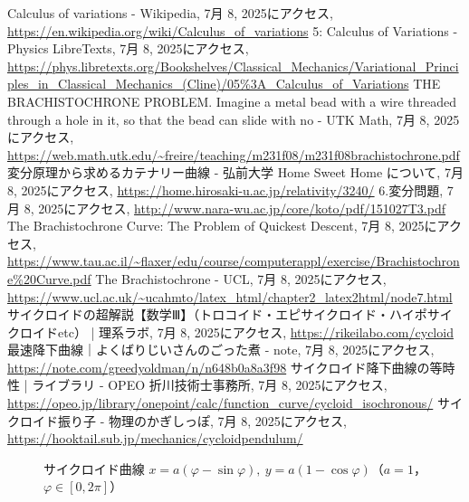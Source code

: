 \documentclass[12pt,a4paper]{ltjsarticle}
\begin{document}
\begin{thebibliography}{99}
 Calculus of variations - Wikipedia, 7月 8, 2025にアクセス, \url{https://en.wikipedia.org/wiki/Calculus_of_variations}
 5: Calculus of Variations - Physics LibreTexts, 7月 8, 2025にアクセス, \url{https://phys.libretexts.org/Bookshelves/Classical_Mechanics/Variational_Principles_in_Classical_Mechanics_(Cline)/05%3A_Calculus_of_Variations}
 THE BRACHISTOCHRONE PROBLEM. Imagine a metal bead with a wire threaded through a hole in it, so that the bead can slide with no - UTK Math, 7月 8, 2025にアクセス, \url{https://web.math.utk.edu/~freire/teaching/m231f08/m231f08brachistochrone.pdf}
 変分原理から求めるカテナリー曲線 - 弘前大学 Home Sweet Home について, 7月 8, 2025にアクセス, \url{https://home.hirosaki-u.ac.jp/relativity/3240/}
 6.変分問題, 7月 8, 2025にアクセス, \url{http://www.nara-wu.ac.jp/core/koto/pdf/151027T3.pdf}
 The Brachistochrone Curve: The Problem of Quickest Descent, 7月 8, 2025にアクセス, \url{https://www.tau.ac.il/~flaxer/edu/course/computerappl/exercise/Brachistochrone%20Curve.pdf}
 The Brachistochrone - UCL, 7月 8, 2025にアクセス, \url{https://www.ucl.ac.uk/~ucahmto/latex_html/chapter2_latex2html/node7.html}
 サイクロイドの超解説【数学Ⅲ】（トロコイド・エピサイクロイド・ハイポサイクロイドetc） | 理系ラボ, 7月 8, 2025にアクセス, \url{https://rikeilabo.com/cycloid}
 最速降下曲線｜よくばりじいさんのごった煮 - note, 7月 8, 2025にアクセス, \url{https://note.com/greedyoldman/n/n648b0a8a3f98}
 サイクロイド降下曲線の等時性 | ライブラリ - OPEO 折川技術士事務所, 7月 8, 2025にアクセス, \url{https://opeo.jp/library/onepoint/calc/function_curve/cycloid_isochronous/}
 サイクロイド振り子 - 物理のかぎしっぽ, 7月 8, 2025にアクセス, \url{https://hooktail.sub.jp/mechanics/cycloidpendulum/}
\end{thebibliography}


\begin{figure}[htbp]
  \centering
  \caption{サイクロイド曲線 $x = a(\varphi - \sin\varphi),\ y = a(1-\cos\varphi)$（$a=1$，$\varphi\in[0,2\pi]$）}
\end{figure}
\end{document}
